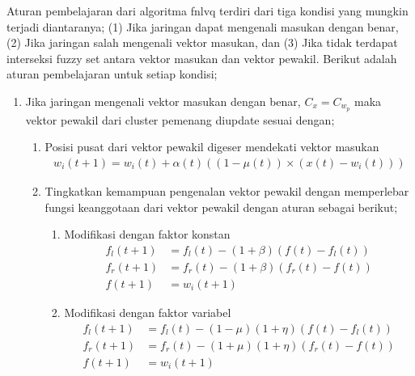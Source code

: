 Aturan pembelajaran dari algoritma \gls{fnlvq} terdiri dari tiga kondisi yang
mungkin terjadi diantaranya; (1) Jika jaringan dapat mengenali masukan dengan
benar, (2) Jika jaringan salah mengenali vektor masukan, dan (3) Jika tidak
terdapat interseksi fuzzy set antara vektor masukan dan vektor pewakil. Berikut
adalah aturan pembelajaran untuk setiap kondisi;
\begin{enumerate}
  \setlength{\itemsep}{1pt}
  \setlength{\parskip}{0pt}
  \setlength{\parsep}{0pt}
  \item Jika jaringan mengenali vektor masukan dengan benar, $C_x = C_{w_p}$
  maka vektor pewakil dari cluster pemenang diupdate sesuai dengan;
  \begin{enumerate}
  	\item Posisi pusat dari vektor pewakil digeser mendekati vektor masukan
  	\begin{align}
  	w_i(t+1) = w_i(t) + \alpha(t) \left((1-\mu(t))\times(x(t) - w_i(t))  \right)
  	\end{align}
  	\item Tingkatkan kemampuan pengenalan vektor pewakil  dengan memperlebar fungsi
  	keanggotaan dari vektor pewakil dengan aturan sebagai berikut;
  	\begin{enumerate}
  	  \item Modifikasi dengan faktor konstan
  	  \begin{align}
  	  f_l(t+1) &= f_l(t) - (1+\beta) (f(t) - f_l(t))  \\
  	  f_r(t+1) &= f_r(t) - (1+\beta) (f_r(t) - f(t)) \nonumber \\
  	  f(t+1)   &= w_i(t+1) \nonumber
  	  \end{align}
  	  
  	  \item Modifikasi dengan faktor variabel
	  \begin{align}
  	  f_l(t+1) &= f_l(t) - (1 - \mu)(1+\eta)(f(t) - f_l(t))  \\
  	  f_r(t+1) &= f_r(t) - (1 + \mu)(1+\eta)(f_r(t) - f(t)) \nonumber \\
  	  f(t+1)   &= w_i(t+1) \nonumber
  	  \end{align}  	  
  	\end{enumerate}
  \end{enumerate}
  

\end{enumerate}
